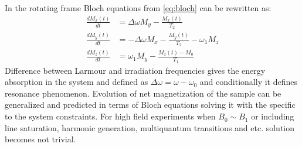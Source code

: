 In the rotating frame Bloch equations from \eqref{eq:bloch} can be rewritten as: 
\begin{subequations}\label{eq:bloch2}
\begin{align}
\frac{dM_x(t)}{dt}& =\Delta\omega M_y-\frac{M_x(t)}{T_2} \\
\frac{dM_y(t)}{dt}& =-\Delta\omega M_x-\frac{M_y(t)}{T_2}-\omega_1M_z \\
\frac{dM_z(t)}{dt} & =\omega_1M_y-\frac{M_z(t)-M_0}{T_1} 
\end{align}
\end{subequations}
Difference between Larmour and irradiation frequencies gives the energy absorption in the system and defined as $\Delta\omega=\omega-\omega_0$ and conditionally it defines resonance phenomenon. Evolution of net magnetization of the sample can be generalized and predicted in terms of Bloch equations solving it with the specific to the system constraints. For high field experiments when $B_0 \sim B_1$ or including line saturation, harmonic generation, multiquantum transitions and etc. solution becomes not trivial. 
